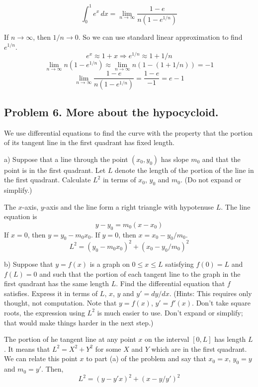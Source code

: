 \documentclass{article}
\begin{document}
\[ \int_{0}^{1}{e^x \, dx} = \lim_{n \to \infty} \frac{1 - e}{n(1 - e^{1/n})}\]
\par If $n \to \infty$, then $1/n \to 0$. So we can use standard linear approximation to find $e^{1/n}$.
\[ e^x \approx 1 + x \Rightarrow e^{1/n} \approx 1 + 1/n \]
\[ \lim_{n \to \infty} n(1 - e^{1/n}) \approx  \lim_{n \to \infty} n(1 - (1 + 1/n)) = -1 \]
\[ \lim_{n \to \infty} \frac{1 - e}{n(1 - e^{1/n})} = \frac{1-e}{-1} = e - 1 \]

\subsection{Problem 6. More about the hypocycloid.}
\begin{tcolorbox}
    We use differential equations to find the curve with the property that the portion of its tangent line in the first quadrant has fixed length.
    \par a) Suppose that a line through the point $(x_0, y_0)$ has slope $m_0$ and that the point is in the first quadrant. Let $L$ denote the length of the portion of the line in the first quadrant. Calculate $L^2$ in terms of $x_0$, $y_0$ and $m_0$. (Do not expand or simplify.)
\end{tcolorbox}
The $x$-axis, $y$-axis and the line form a right triangle with hypotenuse $L$. The line equation is
\[ y - y_0 = m_0(x-x_0) \]
If $x = 0$, then $y = y_0 - m_0x_0$. If $y = 0$, then $x = x_0 - y_0/m_0$.
\[ L^2 = (y_0 - m_0x_0)^2 + (x_0 - y_0/m_0)^2 \]

\begin{tcolorbox}
    b) Suppose that $y = f(x)$ is a graph on $0 \leq x \leq L$ satisfying $f(0) = L$ and $f(L) = 0$ and such that the portion of each tangent line to the graph in the first quadrant has the same length $L$. Find the differential equation that $f$ satisfies. Express it in terms of $L$, $x$, $y$ and $y' = dy/dx$. (Hints: This requires only thought, not computation. Note that $y = f(x)$, $y' = f'(x)$. Don’t take square roots, the expression using $L^2$ is much easier to use. Don’t expand or simplify; that would make things harder in the next step.)
\end{tcolorbox}
The portion of he tangent line at any point $x$ on the interval $[0, L]$ has length $L$. It means that $L^2 = X^2 +Y^2$ for some $X$ and $Y$ which are in the first quadrant. We can relate this point $x$ to part (a) of the problem and say that $x_0 = x$, $y_0 = y$ and $m_0 = y'$. Then,
\[ L^2 = (y - y'x)^2 + (x - y/y')^2 \]
\end{document}
